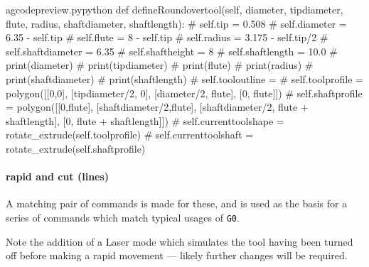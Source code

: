 \documentclass{ltxdoc}
\begin{document}
\lstset{firstnumber=\thegcpy}
\begin{writecode}{a}{gcodepreview.py}{python}
    def defineRoundovertool(self, diameter, tipdiameter, flute, radius, shaftdiameter, shaftlength):
#            self.tip = 0.508
#            self.diameter = 6.35 - self.tip
#            self.flute = 8 - self.tip
#            self.radius = 3.175 - self.tip/2
#            self.shaftdiameter = 6.35
#            self.shaftheight = 8
#            self.shaftlength = 10.0
#        print(diameter)
#        print(tipdiameter)
#        print(flute)
#        print(radius)
#        print(shaftdiameter)
#        print(shaftlength)         
#        self.tooloutline = 
#
        self.toolprofile = polygon([[0,0], [tipdiameter/2, 0], [diameter/2, flute], [0, flute]])
#
        self.shaftprofile = polygon([[0,flute], [shaftdiameter/2,flute], [shaftdiameter/2, flute + shaftlength], [0, flute + shaftlength]])
#
        self.currenttoolshape = rotate_extrude(self.toolprofile)
#
        self.currenttoolshaft = rotate_extrude(self.shaftprofile) 

\end{writecode}
\addtocounter{gcpy}{24}

%
%
%
%

\paragraph{rapid and cut (lines)}

A matching pair of commands is made for these, and  is used as the basis for a series of commands which match typical usages of \verb|G0|.

Note the addition of a Laser mode which simulates the tool having been turned off before making a rapid movement --- likely further changes will be required.
\end{document}
